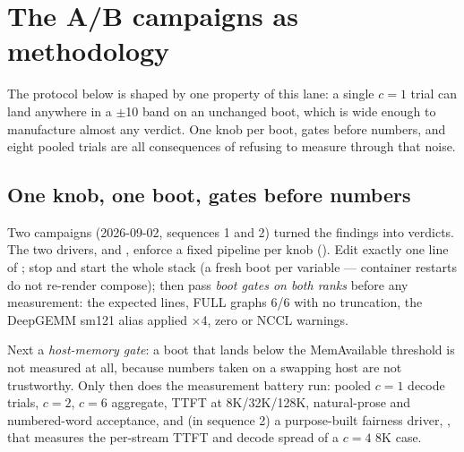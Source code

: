 \section{The A/B campaigns as methodology}
\label{sec:perf-ab}

The protocol below is shaped by one property of this lane: a single $c=1$
trial can land anywhere in a $\pm$10 \tokspersec{} band on an unchanged boot,
which is wide enough to manufacture almost any verdict. One knob per boot,
gates before numbers, and eight pooled trials are all consequences of
refusing to measure through that noise.

\subsection{One knob, one boot, gates before numbers}

Two campaigns (2026-09-02, sequences 1 and 2) turned the findings into
verdicts. The two drivers,  and
, enforce a fixed pipeline per knob
(). Edit exactly one line of ;
stop and start the whole stack (a fresh boot per variable --- container
restarts do not re-render compose); then pass \emph{boot gates on both ranks}
before any measurement: the expected  lines, FULL
graphs 6/6 with no truncation, the DeepGEMM sm121 alias applied $\times$4, zero
 or NCCL warnings.

Next a \emph{host-memory gate}: a boot that
lands below the MemAvailable threshold is not measured at all, because numbers
taken on a swapping host are not trustworthy. Only then does the measurement
battery run: pooled $c=1$ decode trials, $c=2$, $c=6$ aggregate, TTFT at
8K/32K/128K, natural-prose and numbered-word acceptance, and (in sequence 2) a
purpose-built fairness driver, , that measures
the per-stream TTFT and decode spread of a $c=4$ 8K case.

